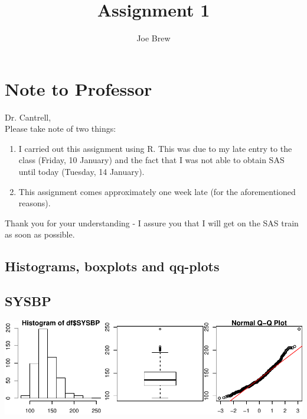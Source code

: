 \documentclass{article}
\title{Assignment 1}
\author{Joe Brew}
\begin{document}

\maketitle



\section*{Note to Professor}
Dr. Cantrell,
\\ 
Please take note of two things: \begin{enumerate}
\item I carried out this assignment using R.  This was due to my late entry to the class (Friday, 10 January) and the fact that I was not able to obtain SAS until today (Tuesday, 14 January).
\item This assignment comes approximately one week late (for the aforementioned reasons). \\
\end{enumerate}
Thank you for your understanding - I assure you that I will get on the SAS train as soon as possible.

\vspace{50mm}

\tableofcontents
{}

\begin{center}
\section*{Histograms, boxplots and qq-plots}
\end{center}

\subsection*{SYSBP}
\begin{center}
\includegraphics{ass1-002}
\end{center}
\end{document}
